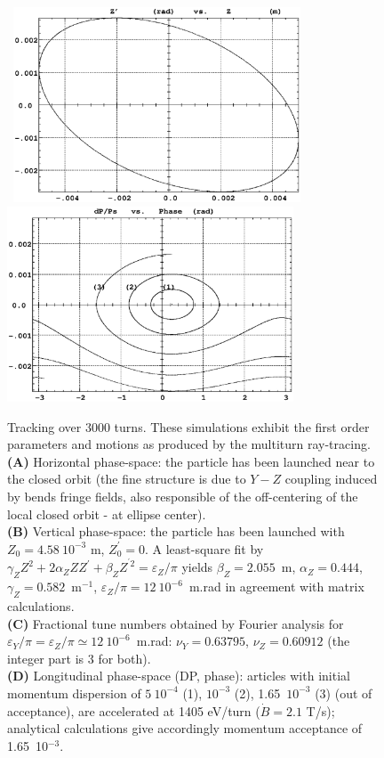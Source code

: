 \begin{figure}[H]
\begin{center}
\vspace{-10mm}
\mbox{
\includegraphics[height=5.8cm]{FigC6-2c.ps}
\includegraphics[height=5.8cm]{FigC6-2d.ps}
}

\vspace{-15mm}
\caption[FigC62]{\label{figC62} \small
Tracking  over 3000 turns. These 
simulations exhibit the first order parameters and 
motions as produced by the multiturn ray-tracing. \\
\textbf{(A)} Horizontal phase-space: the particle has been launched near to 
the  closed orbit (the fine structure is due to $Y-Z$ coupling induced by bends fringe fields, also 
responsible of the off-centering of the local closed orbit - at ellipse center). \\
\textbf{(B)} Vertical phase-space: the particle has been launched with 
$Z_0=4.58\ 10^{-3} $ m, $ Z^{\prime}_ 0=0$.  A least-square fit by 
$ \gamma_ZZ^2+2\alpha_ ZZZ^\prime +\beta_ ZZ^{^\prime 2}=\varepsilon_ Z/\pi $ 
 yields $ \beta_ Z=2.055 $~m, $ \alpha_Z=0.444$, $ \gamma_Z=0.582$~m$ ^{-1} $,  $ \varepsilon_Z/\pi =12\ 10^{-6}$~m.rad
 in agreement with  matrix calculations. \\
\textbf{(C)} Fractional tune numbers obtained by Fourier analysis 
for $ \varepsilon_ Y/\pi =\varepsilon_ Z/\pi \simeq 12\ 10^{-6} $~m.rad: 
$\nu_ Y=0.63795$,  $ \nu_ Z=0.60912 $ (the integer part is 3 for both). \\
\textbf{(D)} Longitudinal phase-space (DP, phase): articles with initial momentum dispersion 
of $ 5\ 10^{-4} $ (1), $ 10^{-3} $ (2),
1.65~$ 10^{-3}$ (3) (out of acceptance), are accelerated at 1405 eV/turn 
($\dot  B=2.1 $ T/s); analytical calculations give accordingly 
momentum acceptance of 1.65~10$^{-3} $. }
\end{center}

\end{figure}

